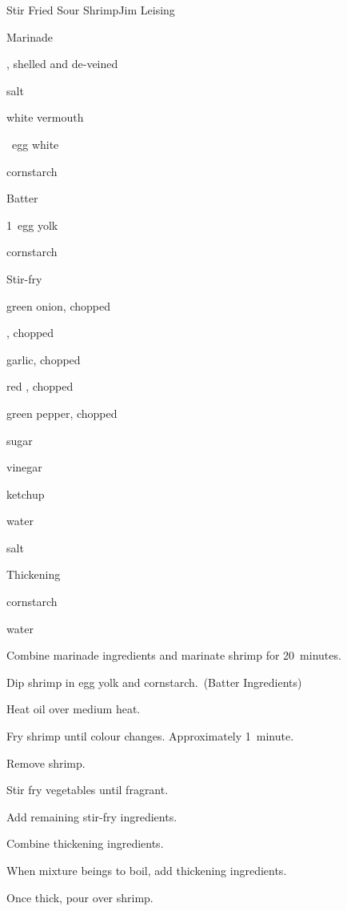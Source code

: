 \begin{recipe}{Stir Fried Sour Shrimp}{Jim Leising}{}

Marinade
\begin{ingredients}
\item \lbs{\twothird} , shelled and de-veined
\item \tp{\quarter} salt
\item \tp{\half} white vermouth
\item \half~egg white
\item {} cornstarch
\end{ingredients}

Batter
\begin{ingredients}
\item 1~egg yolk
\item \Tp{1\half} cornstarch
\end{ingredients}

Stir-fry
\begin{ingredients}
\item \Tp{\half} green onion, chopped
\item \Tp{\half} , chopped
\item \Tp{\half} garlic, chopped
\item \Tp{\half} red , chopped
\item {} green pepper, chopped
\item {} sugar
\item {} vinegar
\item {} ketchup
\item {} water
\item \tp{\quarter} salt
\end{ingredients}

Thickening
\begin{ingredients}
\item \tp{\half} cornstarch
\item \Tp{\half} water
\end{ingredients}

\begin{directions}
\item Combine marinade ingredients and marinate shrimp for 20~minutes.
\item Dip shrimp in egg yolk and cornstarch.~(Batter Ingredients)
\item Heat oil over medium heat.
\item Fry shrimp until colour changes. Approximately 1~minute.
\item Remove shrimp.
\item Stir fry vegetables until fragrant.
\item Add remaining stir-fry ingredients.
\item Combine thickening ingredients.
\item When mixture beings to boil, add thickening ingredients.
\item Once thick, pour over shrimp.
\end{directions}

\end{recipe}
